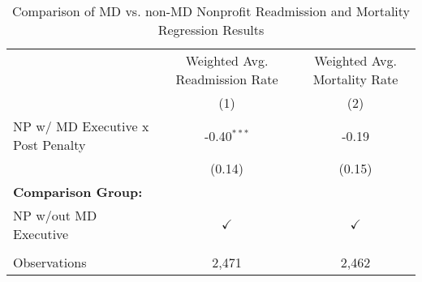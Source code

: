 \begin{table}[htbp]
   \caption{\label{tab:MD_noMD_fullsample} Comparison of MD vs. non-MD Nonprofit Readmission and Mortality Regression Results}
   \bigskip
   \centering
   \begin{tabular}{lcc}
      \toprule
                                        & Weighted Avg. Readmission Rate & Weighted Avg. Mortality Rate\\  
                                        & (1)                            & (2)\\  
      \midrule 
      NP w/ MD Executive x Post Penalty & -0.40$^{***}$                  & -0.19\\   
                                        & (0.14)                         & (0.15)\\   
      \textbf{Comparison Group:}        &                                & \\  
      NP w/out MD Executive             & $\checkmark$                   & $\checkmark$\\   
       \\
      Observations                      & 2,471                          & 2,462\\  
      \bottomrule
   \end{tabular}
\end{table}
